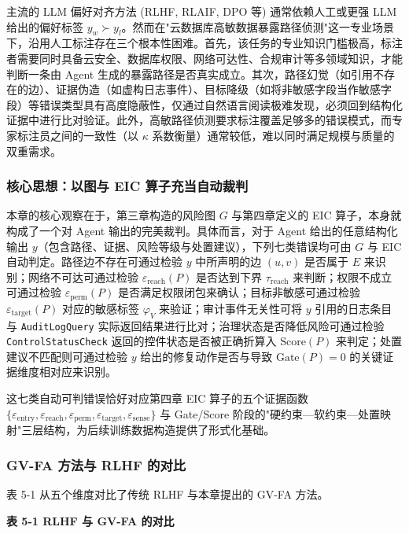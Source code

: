 \documentclass[a4paper,12pt]{ctexart}
\begin{document}
主流的 LLM 偏好对齐方法 (RLHF, RLAIF, DPO 等) 通常依赖人工或更强 LLM 给出的偏好标签 $y_w \succ y_l$。然而在"云数据库高敏数据暴露路径侦测"这一专业场景下，沿用人工标注存在三个根本性困难。首先，该任务的专业知识门槛极高，标注者需要同时具备云安全、数据库权限、网络可达性、合规审计等多领域知识，才能判断一条由 Agent 生成的暴露路径是否真实成立。其次，路径幻觉（如引用不存在的边）、证据伪造（如虚构日志事件）、目标降级（如将非敏感字段当作敏感字段）等错误类型具有高度隐蔽性，仅通过自然语言阅读极难发现，必须回到结构化证据中进行比对验证。此外，高敏路径侦测要求标注覆盖足够多的错误模式，而专家标注员之间的一致性（以 $\kappa$ 系数衡量）通常较低，难以同时满足规模与质量的双重需求。

\subsubsection{核心思想：以图与 EIC 算子充当自动裁判}

本章的核心观察在于，第三章构造的风险图 $G$ 与第四章定义的 EIC 算子，本身就构成了一个对 Agent 输出的完美裁判。具体而言，对于 Agent 给出的任意结构化输出 $y$（包含路径、证据、风险等级与处置建议），下列七类错误均可由 $G$ 与 EIC 自动判定。路径边不存在可通过检验 $y$ 中所声明的边 $(u,v)$ 是否属于 $E$ 来识别；网络不可达可通过检验 $\varepsilon_{\mathrm{reach}}(P)$ 是否达到下界 $\tau_{\mathrm{reach}}$ 来判断；权限不成立可通过检验 $\varepsilon_{\mathrm{perm}}(P)$ 是否满足权限闭包来确认；目标非敏感可通过检验 $\varepsilon_{\mathrm{target}}(P)$ 对应的敏感标签 $\varphi_V$ 来验证；审计事件无关性可将 $y$ 引用的日志条目与 \texttt{AuditLogQuery} 实际返回结果进行比对；治理状态是否降低风险可通过检验 \texttt{ControlStatusCheck} 返回的控件状态是否被正确折算入 $\mathrm{Score}(P)$ 来判定；处置建议不匹配则可通过检验 $y$ 给出的修复动作是否与导致 $\mathrm{Gate}(P)=0$ 的关键证据维度相对应来识别。

这七类自动可判错误恰好对应第四章 EIC 算子的五个证据函数 $\{\varepsilon_{\mathrm{entry}},\varepsilon_{\mathrm{reach}},\varepsilon_{\mathrm{perm}},\varepsilon_{\mathrm{target}},\varepsilon_{\mathrm{sense}}\}$ 与 Gate/Score 阶段的"硬约束—软约束—处置映射"三层结构，为后续训练数据构造提供了形式化基础。

\subsubsection{GV-FA 方法与 RLHF 的对比}

表 5-1 从五个维度对比了传统 RLHF 与本章提出的 GV-FA 方法。

\textbf{表 5-1 RLHF 与 GV-FA 的对比}
\end{document}
